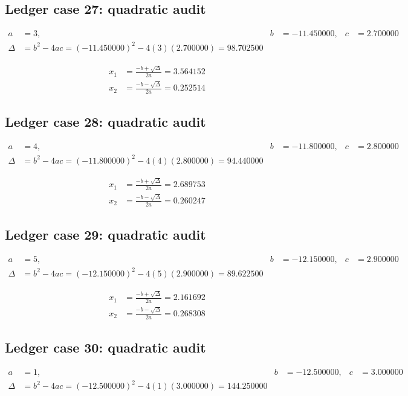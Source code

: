 \documentclass[11pt,a4paper]{article}
\begin{document}
\subsection{Ledger case 27: quadratic audit}
\begin{align}
a &= 3, & b &= -11.450000, & c &= 2.700000 \\
\Delta &= b^2-4ac = (-11.450000)^2 - 4(3)(2.700000) = 98.702500
\end{align}

\begin{align}
x_1 &= \frac{-b+\sqrt{\Delta}}{2a} = 3.564152 \\
x_2 &= \frac{-b-\sqrt{\Delta}}{2a} = 0.252514
\end{align}

\newpage

\subsection{Ledger case 28: quadratic audit}
\begin{align}
a &= 4, & b &= -11.800000, & c &= 2.800000 \\
\Delta &= b^2-4ac = (-11.800000)^2 - 4(4)(2.800000) = 94.440000
\end{align}

\begin{align}
x_1 &= \frac{-b+\sqrt{\Delta}}{2a} = 2.689753 \\
x_2 &= \frac{-b-\sqrt{\Delta}}{2a} = 0.260247
\end{align}

\subsection{Ledger case 29: quadratic audit}
\begin{align}
a &= 5, & b &= -12.150000, & c &= 2.900000 \\
\Delta &= b^2-4ac = (-12.150000)^2 - 4(5)(2.900000) = 89.622500
\end{align}

\begin{align}
x_1 &= \frac{-b+\sqrt{\Delta}}{2a} = 2.161692 \\
x_2 &= \frac{-b-\sqrt{\Delta}}{2a} = 0.268308
\end{align}

\subsection{Ledger case 30: quadratic audit}
\begin{align}
a &= 1, & b &= -12.500000, & c &= 3.000000 \\
\Delta &= b^2-4ac = (-12.500000)^2 - 4(1)(3.000000) = 144.250000
\end{align}
\end{document}
